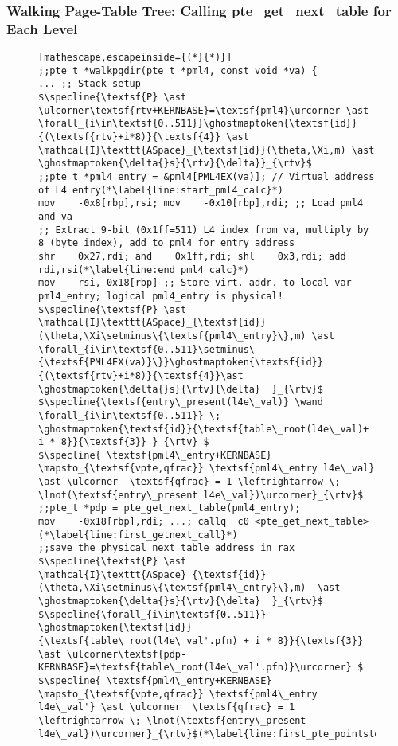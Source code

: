 \subsubsection{Walking Page-Table Tree: Calling \textsf{pte\_get\_next\_table} for Each Level}
\label{wlkpgdir}
\begin{figure}\footnotesize
\ifPLDI
\begin{lstlisting}[mathescape,escapeinside={(*}{*)}]
;;pte_t *walkpgdir(pte_t *pml4, const void *va) {
... ;; Stack setup
$\specline{\textsf{P} \ast \ulcorner\textsf{rtv+KERNBASE}=\textsf{pml4}\urcorner \ast \forall_{i\in\textsf{0..511}}\ghostmaptoken{\textsf{id}}{(\textsf{rtv}+i*8)}{\textsf{4}} \ast \mathcal{I}\texttt{ASpace}_{\textsf{id}}(\theta,\Xi,m) \ast \ghostmaptoken{\delta{}s}{\rtv}{\delta}}_{\rtv}$
;;pte_t *pml4_entry = &pml4[PML4EX(va)]; // Virtual address of L4 entry(*\label{line:start_pml4_calc}*)
mov    -0x8[rbp],rsi; mov    -0x10[rbp],rdi; ;; Load pml4 and va
;; Extract 9-bit (0x1ff=511) L4 index from va, multiply by 8 (byte index), add to pml4 for entry address
shr    0x27,rdi; and    0x1ff,rdi; shl    0x3,rdi; add    rdi,rsi(*\label{line:end_pml4_calc}*)
mov    rsi,-0x18[rbp] ;; Store virt. addr. to local var pml4_entry; logical pml4_entry is physical!
$\specline{\textsf{P} \ast \mathcal{I}\texttt{ASpace}_{\textsf{id}}(\theta,\Xi\setminus\{\textsf{pml4\_entry}\},m) \ast \forall_{i\in\textsf{0..511}\setminus\{\textsf{PML4EX(va)}\}}\ghostmaptoken{\textsf{id}}{(\textsf{rtv}+i*8)}{\textsf{4}}\ast \ghostmaptoken{\delta{}s}{\rtv}{\delta}  }_{\rtv}$
$\specline{\textsf{entry\_present(l4e\_val)} \wand \forall_{i\in\textsf{0..511}} \; \ghostmaptoken{\textsf{id}}{\textsf{table\_root(l4e\_val)+ i * 8}}{\textsf{3}} }_{\rtv} $
$\specline{ \textsf{pml4\_entry+KERNBASE} \mapsto_{\textsf{vpte,qfrac}} \textsf{pml4\_entry l4e\_val} \ast \ulcorner  \textsf{qfrac} = 1 \leftrightarrow \; \lnot(\textsf{entry\_present l4e\_val})\urcorner}_{\rtv}$    
;;pte_t *pdp = pte_get_next_table(pml4_entry);
mov    -0x18[rbp],rdi; ...; callq  c0 <pte_get_next_table>(*\label{line:first_getnext_call}*)
;;save the physical next table address in rax
$\specline{\textsf{P} \ast \mathcal{I}\texttt{ASpace}_{\textsf{id}}(\theta,\Xi\setminus\{\textsf{pml4\_entry}\},m)  \ast \ghostmaptoken{\delta{}s}{\rtv}{\delta}  }_{\rtv}$
$\specline{\forall_{i\in\textsf{0..511}} \ghostmaptoken{\textsf{id}}{\textsf{table\_root(l4e\_val'.pfn) + i * 8}}{\textsf{3}}  \ast \ulcorner\textsf{pdp-KERNBASE}=\textsf{table\_root(l4e\_val'.pfn)}\urcorner} $
$\specline{ \textsf{pml4\_entry+KERNBASE} \mapsto_{\textsf{vpte,qfrac}} \textsf{pml4\_entry l4e\_val'} \ast \ulcorner  \textsf{qfrac} = 1 \leftrightarrow \; \lnot(\textsf{entry\_present l4e\_val})\urcorner}_{\rtv}$(*\label{line:first_pte_pointsto}*)

\end{lstlisting}
\end{figure}
